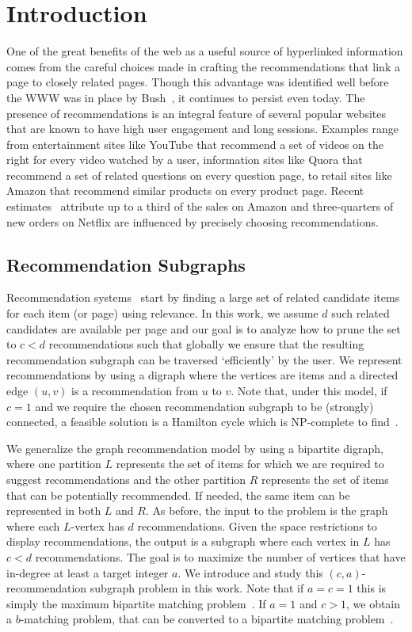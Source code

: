 
\section{Introduction}

One of the great benefits of the web as a useful source of hyperlinked
information comes from the careful choices made in crafting the
recommendations that link a page to closely related pages. Though this
advantage was identified well before the WWW was in place by
Bush~\cite{Bush45aswe}, it continues to persist even today. The
presence of recommendations is an integral feature of several popular
websites that are known to have high user engagement and long
sessions. Examples range from entertainment sites like YouTube that
recommend a set of videos on the right for every video watched by a
user, information sites like Quora that recommend a set of related
questions on every question page, to retail sites like Amazon that
recommend similar products on every product page. Recent
estimates~\cite{big-data-book13} attribute up to a third of the sales
on Amazon and three-quarters of new orders on Netflix are influenced by precisely choosing recommendations.

\subsection{Recommendation Subgraphs}
Recommendation systems~\cite{Schafer1999, Adomavicius2005,
  Resnick1997} start by finding a large set of related candidate items
for each item (or page) using relevance. In this work, we assume $d$
such related candidates are available per page and our goal is to
analyze how to prune the set to $c < d$ recommendations such that
globally we ensure that the resulting recommendation subgraph can be traversed
`efficiently' by the user. We represent recommendations
by using a digraph where the vertices are items and a directed
edge $(u, v)$ is a recommendation from $u$ to $v$. Note that, under
this model, if $c=1$ and we require the chosen recommendation subgraph
to be (strongly) connected, a feasible solution is a Hamilton cycle
which is NP-complete to find~\cite{CLRS2001}.

We generalize the graph recommendation model by using a bipartite
digraph, where one partition $L$ represents the set of items for which
we are required to suggest recommendations and the other partition $R$
represents the set of items that can be potentially recommended. If
needed, the same item can be represented in both $L$ and $R$.  As
before, the input to the problem is the graph where each
$L$-vertex has $d$ recommendations. Given the space restrictions to
display recommendations, the output is a subgraph where each vertex in
$L$ has $c < d$ recommendations. The goal is to maximize the number of
vertices that have in-degree at least a target integer $a$. We
introduce and study this $(c, a)$-recommendation subgraph problem in
this work.  Note that if $a=c=1$ this is simply the maximum bipartite
matching problem~\cite{LovaszPlummer1986}. If $a=1$ and $c > 1$, we
obtain a $b$-matching problem, that can be converted to a bipartite
matching problem~\cite{Gabow1983}.\vs

